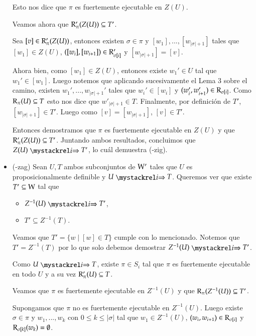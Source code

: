 \begin{demostracion}
\begin{itemize}
        Esto nos dice que $\pi$ es fuertemente ejecutable en $Z(U)$.

        Veamos ahora que $\mathrm{R}'_\pi(Z(U)) \subseteq T'$.

        Sea $[v] \in \mathrm{R}'_\pi(Z(U))$, entonces existen $\sigma \in \pi$ y $[w_1], ..., [w_{|\sigma|+1}]$ tales que $[w_1] \in Z(U)$, $([w_i],[w_{i+1}]) \in \mathrm{R}'_{\sigma[i]}$ y $[w_{|\sigma|+1}] = [v]$.

        Ahora bien, como $[w_1] \in Z(U)$, entonces existe $w_1' \in U$ tal que $w_1'\in [w_1]$. Luego notemos que aplicando sucesivamente el Lema 3 sobre el camino, existen $w_1',...,w_{|\sigma|+1}'$ tales que $w_i' \in [w_i]$ y $(w_i',w_{i+1}')\in \mathrm{R}_{\sigma[i]}$. Como $\mathrm{R}_\pi(U) \subseteq T$ esto nos dice que $w'_{|\sigma|+1} \in T$. Finalmente, por definición de $T'$, $[w_{|\sigma|+1}] \in T'$. Luego como $[v] = [w_{|\sigma|+1}]$, $[v] \in T'$.

        Entonces demostramos que $\pi$ es fuertemente ejecutable en $Z(U)$ y que $\mathrm{R}'_\pi(Z(U)) \subseteq T'$. Juntando ambos resultados, concluimos que $Z(U) \ultsExecAgi T'$, lo cuál demuestra (\KHilogic-zig).

       \item (\KHilogic-zag) Sean $U,T$ ambos subconjuntos de $\mathrm{W}'$ tales que $U$ es proposicionalmente definible y $U \ultsExecAgi T$. Queremos ver que existe $T' \subseteq \mathrm{W}$ tal que

       \begin{multicols}{2}
            \begin{itemize}
                \item $Z^{-1}(U) \ultsExecAgi T'$, 
                \item $T' \subseteq Z^{-1}(T)$.
            \end{itemize}
        \end{multicols}

        Veamos que $T' = \{w \mid [w] \in T\}$ cumple con lo mencionado. Notemos que $T' = Z^{-1}(T)$ por lo que solo debemos demostrar $Z^{-1}(U) \ultsExecAgi T'$.

        Como $U \ultsExecAgi T$, existe $\pi \in S_i$ tal que $\pi$ es fuertemente ejecutable en todo $U$ y a su vez $\mathrm{R}'_\pi(U) \subseteq T$.

        Veamos que $\pi$ es fuertemente ejecutable en $Z^{-1}(U)$ y que $\mathrm{R}_\pi(Z^{-1}(U)) \subseteq T'$.

        Supongamos que $\pi$ no es fuertemente ejecutable en $Z^{-1}(U)$. Luego existe $\sigma \in \pi$ y $w_1,...,w_k$ con $0 \le k \le |\sigma|$ tal que $w_1 \in Z^{-1}(U)$, $(w_i,w_{i+1}) \in \mathrm{R}_{\sigma[i]}$ y $\mathrm{R}_{\sigma[k]}(w_k) = \emptyset$. 


\end{itemize}
\end{demostracion}

